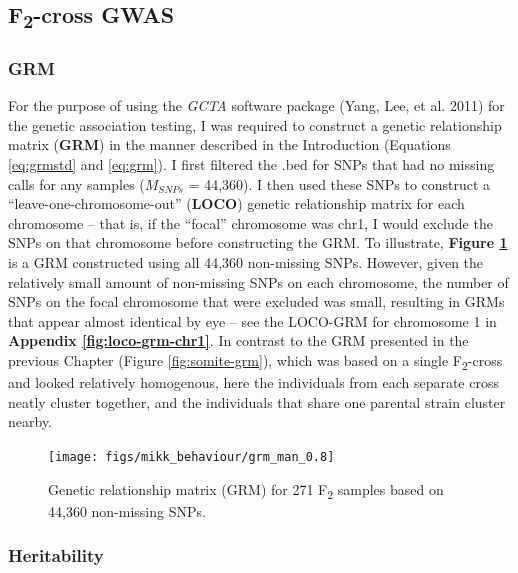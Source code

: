 \documentclass[
]{book}
\begin{document}
\hypertarget{f2-cross-gwas}{%
\subsection{\texorpdfstring{F\textsubscript{2}-cross GWAS}{F2-cross GWAS}}\label{f2-cross-gwas}}

\hypertarget{grm}{%
\subsubsection{GRM}\label{grm}}

For the purpose of using the \emph{GCTA} software package (Yang, Lee, et al. 2011) for the genetic association testing, I was required to construct a genetic relationship matrix (\textbf{GRM}) in the manner described in the Introduction (Equations \eqref{eq:grmstd} and \eqref{eq:grm}). I first filtered the .bed for SNPs that had no missing calls for any samples (\(M_{SNPs}\) = 44,360). I then used these SNPs to construct a ``leave-one-chromosome-out'' (\textbf{LOCO}) genetic relationship matrix for each chromosome -- that is, if the ``focal'' chromosome was chr1, I would exclude the SNPs on that chromosome before constructing the GRM. To illustrate, \textbf{Figure \ref{fig:F2-grm}} is a GRM constructed using all 44,360 non-missing SNPs. However, given the relatively small amount of non-missing SNPs on each chromosome, the number of SNPs on the focal chromosome that were excluded was small, resulting in GRMs that appear almost identical by eye -- see the LOCO-GRM for chromosome 1 in \textbf{Appendix \ref{fig:loco-grm-chr1}}. In contrast to the GRM presented in the previous Chapter (Figure \ref{fig:somite-grm}), which was based on a single F\textsubscript{2}-cross and looked relatively homogenous, here the individuals from each separate cross neatly cluster together, and the individuals that share one parental strain cluster nearby.



\begin{figure}
\texttt{[image: figs/mikk\_behaviour/grm\_man\_0.8]} \caption{Genetic relationship matrix (GRM) for 271 F\textsubscript{2} samples based on 44,360 non-missing SNPs.}\label{fig:F2-grm}
\end{figure}

\hypertarget{heritability}{%
\subsubsection{Heritability}\label{heritability}}
\end{document}
